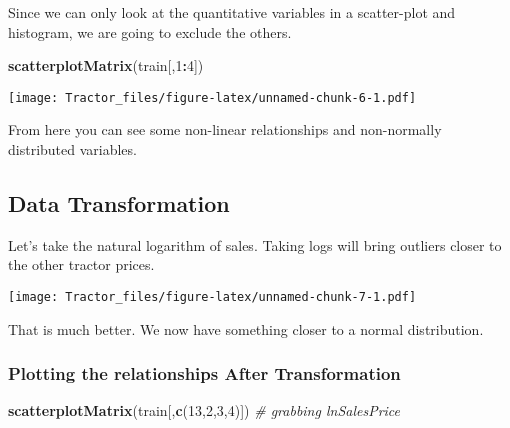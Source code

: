 \documentclass[
]{article}
\newenvironment{Shaded}{\begin{snugshade}}{\end{snugshade}}
\newcommand{\AttributeTok}[1]{\textcolor[rgb]{0.13,0.29,0.53}{#1}}
\newcommand{\CommentTok}[1]{\textcolor[rgb]{0.56,0.35,0.01}{\textit{#1}}}
\newcommand{\DecValTok}[1]{\textcolor[rgb]{0.00,0.00,0.81}{#1}}
\newcommand{\FunctionTok}[1]{\textcolor[rgb]{0.13,0.29,0.53}{\textbf{#1}}}
\newcommand{\NormalTok}[1]{#1}
\newcommand{\OtherTok}[1]{\textcolor[rgb]{0.56,0.35,0.01}{#1}}
\newcommand{\SpecialCharTok}[1]{\textcolor[rgb]{0.81,0.36,0.00}{\textbf{#1}}}
\begin{document}
Since we can only look at the quantitative variables in a scatter-plot
and histogram, we are going to exclude the others.

\begin{Shaded}
\begin{Highlighting}[]
\FunctionTok{scatterplotMatrix}\NormalTok{(train[,}\DecValTok{1}\SpecialCharTok{:}\DecValTok{4}\NormalTok{])}
\end{Highlighting}
\end{Shaded}

\texttt{[image: Tractor\_files/figure-latex/unnamed-chunk-6-1.pdf]}

From here you can see some non-linear relationships and non-normally
distributed variables.

\subsection{Data Transformation}\label{data-transformation}

Let's take the natural logarithm of sales. Taking logs will bring
outliers closer to the other tractor prices.

\begin{Shaded}
\end{Shaded}

\texttt{[image: Tractor\_files/figure-latex/unnamed-chunk-7-1.pdf]}

That is much better. We now have something closer to a normal
distribution.

\subsubsection{Plotting the relationships After
Transformation}\label{plotting-the-relationships-after-transformation}

\begin{Shaded}
\begin{Highlighting}[]
\FunctionTok{scatterplotMatrix}\NormalTok{(train[,}\FunctionTok{c}\NormalTok{(}\DecValTok{13}\NormalTok{,}\DecValTok{2}\NormalTok{,}\DecValTok{3}\NormalTok{,}\DecValTok{4}\NormalTok{)]) }\CommentTok{\# grabbing lnSalesPrice}
\end{Highlighting}
\end{Shaded}
\end{document}
